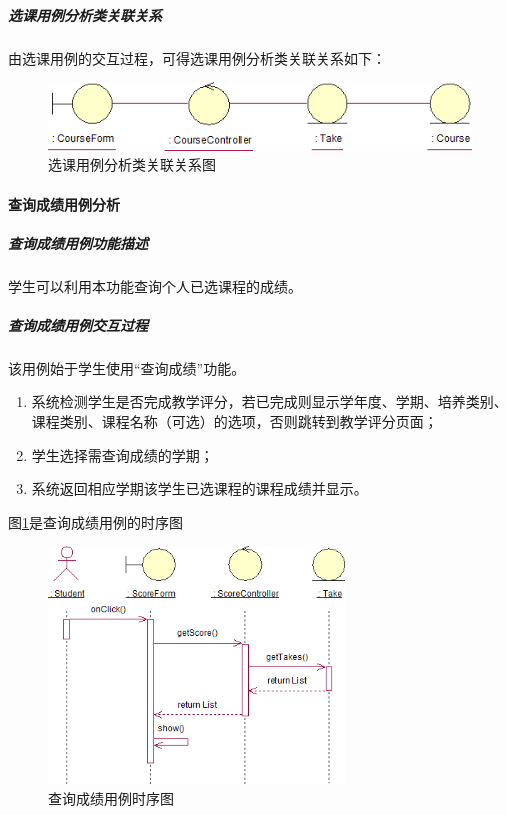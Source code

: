 \subparagraph{选课用例分析类关联关系}
由选课用例的交互过程，可得选课用例分析类关联关系如下：
\begin{figure}[H]
  \centering
  \includegraphics[width=\textwidth]{img/selectcourse_depend}
  \caption{选课用例分析类关联关系图}
\end{figure}
  
\paragraph{查询成绩用例分析}
\subparagraph{查询成绩用例功能描述}

学生可以利用本功能查询个人已选课程的成绩。
    
\subparagraph{查询成绩用例交互过程}
    
该用例始于学生使用“查询成绩”功能。
\begin{enumerate}
  \item 系统检测学生是否完成教学评分，若已完成则显示学年度、学期、培养类别、课程类别、课程名称（可选）的选项，否则跳转到教学评分页面；
  \item 学生选择需查询成绩的学期；
  \item 系统返回相应学期该学生已选课程的课程成绩并显示。
\end{enumerate}
    
图\ref{fig:query_achievement_sequence}是查询成绩用例的时序图
\begin{figure}
  \centering
  \includegraphics[width=0.7\textwidth]{img/query_achievement_sequence}
  \caption{查询成绩用例时序图}
  \label{fig:query_achievement_sequence}
\end{figure}
    
